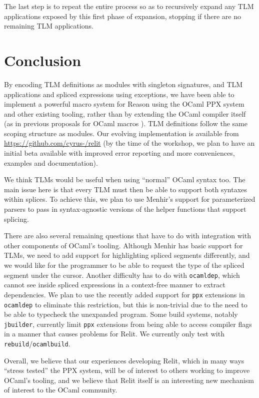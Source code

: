 \documentclass[acmsmall,review]{acmart}
\newcommand{\li}[1]{\lstinline[basicstyle=\ttfamily\fontsize{9pt}{1em}\selectfont]{#1}}
\theoremstyle{slplain}
\numberwithin{thm}{section}
\begin{document}
The last step is to repeat the entire process so as to recursively expand any TLM applications exposed by this first phase of expansion, stopping if there are no remaining TLM applications.

\section{Conclusion}
By encoding TLM definitions as modules with singleton signatures, and TLM applications and spliced expressions using exceptions, we have been able to implement a powerful macro system for Reason using the OCaml PPX system and other existing tooling, rather than by extending the OCaml compiler itself (as in previous proposals for OCaml macros \cite{modular-macros}). TLM definitions follow the same scoping structure as modules. Our evolving implementation is available from \url{https://github.com/cyrus-/relit} (by the time of the workshop, we plan to have an initial beta available with improved error reporting and more conveniences, examples and documentation). 


We think TLMs would be useful when using ``normal'' OCaml syntax too. The main issue here is that every TLM must then be able to support both syntaxes within splices. To achieve this, we plan to use Menhir's support for parameterized parsers to pass in syntax-agnostic versions of the helper functions that support  splicing.

There are also several remaining questions that have to do with integration with other components of OCaml's tooling. Although Menhir has basic support for TLMs, we need to add support for highlighting spliced segments differently, and we would like for the programmer to be able to request the type of the spliced segment under the cursor. Another difficulty has to do with \li{ocamldep}, which cannot see inside spliced expressions in a context-free manner to extract dependencies. We plan to use the recently added support for \li{ppx} extensions in \li{ocamldep} to eliminate this restriction, but this is non-trivial due to the need to be able to typecheck the unexpanded program. Some build systems, notably \li{jbuilder}, currently limit \li{ppx} extensions from being able to access compiler flags in a manner that causes problems for Relit. We currently only test with \li{rebuild}/\li{ocamlbuild}.

Overall, we believe that our experiences developing Relit, which in many ways ``stress tested'' the PPX system, will be of interest to others working to improve OCaml's tooling, and we believe that Relit itself is an interesting new mechanism of interest to the OCaml community. 




% 
\end{document}
